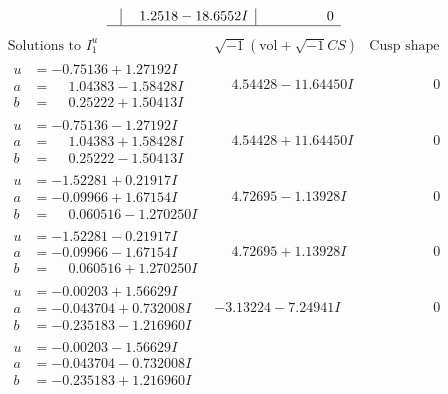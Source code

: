 \documentclass[1p]{elsarticle_modified}
\theoremstyle{definition}
\newcommand{\I}{\sqrt{-1}}
\begin{document}
$$\begin{array}{c|c|c}
 & \phantom{-}1.2518 - 18.6552 I & \phantom{-0.000000 } 0\\
 \hline 
 \end{array}$$\newpage$$\begin{array}{c|c|c}  
\text{Solutions to }I^u_{1}& \I (\text{vol} + \sqrt{-1}CS) & \text{Cusp shape}\\
 \hline 
\begin{aligned}
u &= -0.75136 + 1.27192 I \\
a &= \phantom{-}1.04383 - 1.58428 I \\
b &= \phantom{-}0.25222 + 1.50413 I\end{aligned}
 & \phantom{-}4.54428 - 11.64450 I & \phantom{-0.000000 } 0 \\ \hline\begin{aligned}
u &= -0.75136 - 1.27192 I \\
a &= \phantom{-}1.04383 + 1.58428 I \\
b &= \phantom{-}0.25222 - 1.50413 I\end{aligned}
 & \phantom{-}4.54428 + 11.64450 I & \phantom{-0.000000 } 0 \\ \hline\begin{aligned}
u &= -1.52281 + 0.21917 I \\
a &= -0.09966 + 1.67154 I \\
b &= \phantom{-}0.060516 - 1.270250 I\end{aligned}
 & \phantom{-}4.72695 - 1.13928 I & \phantom{-0.000000 } 0 \\ \hline\begin{aligned}
u &= -1.52281 - 0.21917 I \\
a &= -0.09966 - 1.67154 I \\
b &= \phantom{-}0.060516 + 1.270250 I\end{aligned}
 & \phantom{-}4.72695 + 1.13928 I & \phantom{-0.000000 } 0 \\ \hline\begin{aligned}
u &= -0.00203 + 1.56629 I \\
a &= -0.043704 + 0.732008 I \\
b &= -0.235183 - 1.216960 I\end{aligned}
 & -3.13224 - 7.24941 I & \phantom{-0.000000 } 0 \\ \hline\begin{aligned}
u &= -0.00203 - 1.56629 I \\
a &= -0.043704 - 0.732008 I \\
b &= -0.235183 + 1.216960 I\end{aligned}

\end{array}$$
\end{document}
